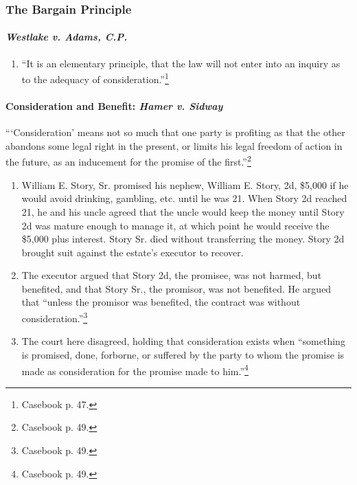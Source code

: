 \subsubsection{The Bargain Principle}

\paragraph{\emph{Westlake v. Adams, C.P.}}

\begin{enumerate}
    \item ``It is an elementary principle, that the law will not enter into an 
    inquiry as to the adequacy of consideration.''\footnote{Casebook p. 47.}
\end{enumerate}
 
\paragraph{Consideration and Benefit: \emph{Hamer v. Sidway}}

\enquote{\enquote{Consideration} means not so much that one party is profiting 
as that the other abandons some legal right in the present, or limits his 
legal freedom of action in the future, as an inducement for the promise of the 
first.}\footnote{Casebook p. 49.}

\begin{enumerate}
    \item William E. Story, Sr. promised his nephew, William E. Story, 2d, 
    \$5,000 if he would avoid drinking, gambling, etc. until he was 21. When 
    Story 2d reached 21, he and his uncle agreed that the uncle would keep 
    the money until Story 2d was mature enough to manage it, at which point he 
    would receive the \$5,000 plus interest. Story Sr. died without 
    transferring the money. Story 2d brought suit against the estate's 
    executor to recover.
    \item The executor argued that Story 2d, the promisee, was not harmed, but 
    benefited, and that Story Sr., the promisor, was not benefited. He argued 
    that ``unless the promisor was benefited, the contract was without 
    consideration.''\footnote{Casebook p. 49.}
    \item The court here disagreed, holding that consideration exists when 
    ``something is promised, done, forborne, or suffered by the party to whom 
    the promise is made as consideration for the promise made to 
    him.''\footnote{Casebook p. 49.}
\end{enumerate}


